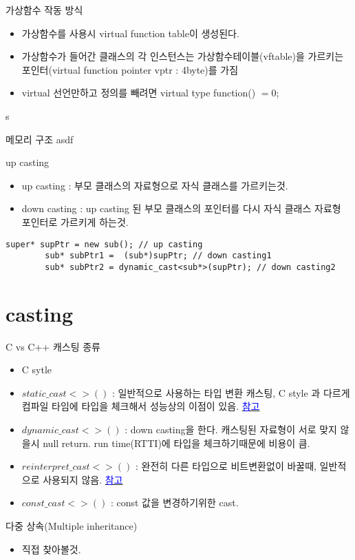 \documentclass[10pt]{beamer}
\begin{document}
\begin{frame}{가상함수 작동 방식}
    \begin{itemize}
        \item 가상함수를 사용시 virtual function table이 생성된다.
        \item 가상함수가 들어간 클래스의 각 인스턴스는 가상함수테이블(vftable)을 가르키는 포인터(virtual function pointer vptr : 4byte)를 가짐
        \item virtual 선언만하고 정의를 빼려면 virtual type function() $=0$;
    \end{itemize}s
\end{frame}


\begin{frame}[fragile]{메모리 구조}
    asdf
\end{frame}    


\begin{frame}[fragile]{up casting}
    \begin{itemize}
        \item up casting : 부모 클래스의 자료형으로 자식 클래스를 가르키는것.
        \item down casting : up casting 된 부모 클래스의 포인터를 다시 자식 클래스 자료형 포인터로 가르키게 하는것.
    \end{itemize}
    \begin{lstlisting}[style = CppStyle]
        super* supPtr = new sub(); // up casting
        sub* subPtr1 =  (sub*)supPtr; // down casting1
        sub* subPtr2 = dynamic_cast<sub*>(supPtr); // down casting2
    \end{lstlisting}
\end{frame}

\section{casting}

\begin{frame}{C vs C++ 캐스팅 종류}
    \begin{itemize}
        \item C sytle 
        \item $static\_cast<>()$ : 일반적으로 사용하는 타입 변환 캐스팅, C style 과 다르게 컴파일 타임에 타입을 체크해서 성능상의 이점이 있음. \href{https://stackoverflow.com/questions/28002/regular-cast-vs-static-cast-vs-dynamic-cast}{\textcolor{blue}{참고}}
        \item $dynamic\_cast<>()$ : down casting을 한다. 캐스팅된 자료형이 서로 맞지 않을시 null return. run time(RTTI)에 타입을 체크하기때문에 비용이 큼.
        \item $reinterpret\_cast<>()$ : 완전히 다른 타입으로 비트변환없이 바꿀때, 일반적으로 사용되지 않음. \href{https://stackoverflow.com/questions/573294/when-to-use-reinterpret-cast}{\textcolor{blue}{참고}}
        \item $const\_cast<>()$ : const 값을 변경하기위한 cast.
    \end{itemize}
\end{frame}


\begin{frame}{다중 상속(Multiple inheritance)}
    \begin{itemize}
        \item 직접 찾아볼것.
    \end{itemize}    
\end{frame}    
\end{document}
